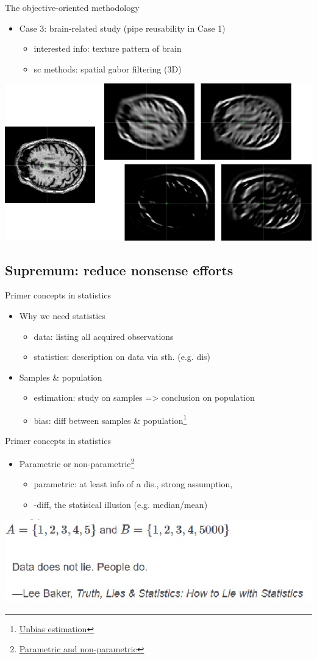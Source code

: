 \documentclass[11pt]{beamer}
\newcommand{\uniitem}[1]{\begin{itemize}\item #1 \end{itemize}}
\newcommand{\ftref}[2]{{\color{blue}\footnotesize \href{#1}{#2}}}
\begin{document}
\begin{frame}{The objective-oriented methodology}
	\uniitem{Case 3: brain-related study (pipe reusability in Case 1)
		\uniitem{interested info: texture pattern of brain}
		\uniitem{sc methods: spatial gabor filtering (3D)}}
	\centering
	\includegraphics[scale=0.9]{brain.jpg}
\end{frame}

\subsection{Supremum: reduce nonsense efforts}

\begin{frame}{Primer concepts in statistics}
	\uniitem{Why we need statistics
		\uniitem{data: listing all acquired observations}
		\uniitem{statistics: description on data via sth. (e.g. dis)}}
	\uniitem{Samples \& population
		\uniitem{estimation: study on samples => conclusion on population}
		\uniitem{bias: diff between samples \& population\footnote[frame]{\ftref{https://informatics.readthedocs.io/en/latest/supplement/supp\_b2.html\#unbias-estimation}{Unbias estimation}}}}
\end{frame}

\begin{frame}{Primer concepts in statistics}
	\uniitem{Parametric or non-parametric\footnote[frame]{\ftref{https://informatics.readthedocs.io/en/latest/supplement/supp\_a4.html\#id5}{Parametric and non-parametric}}
		\uniitem{parametric: at least info of a dis., strong assumption,}
		\uniitem{-diff, the statisical illusion (e.g. median/mean)}}
	\centering
	\includegraphics[scale=0.8]{params.jpg}
\end{frame}
\end{document}
